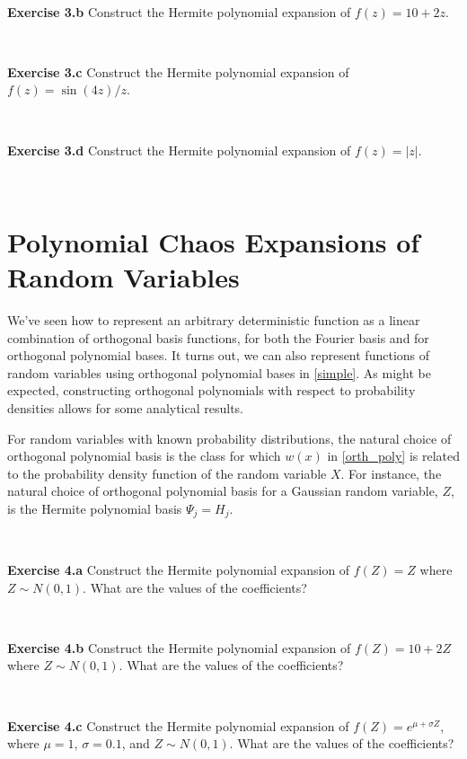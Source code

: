 \documentclass[11pt]{article}
\numberwithin{equation}{section}
\begin{document}
\

\textbf{Exercise 3.b} Construct the Hermite polynomial expansion of $f(z) = 10 + 2z$.

\

\textbf{Exercise 3.c} Construct the Hermite polynomial expansion of $f(z) = \sin(4z)/z$.

\

\textbf{Exercise 3.d} Construct the Hermite polynomial expansion of $f(z) = |z|$.

\






\section{Polynomial Chaos Expansions of Random Variables}

We've seen how to represent an arbitrary deterministic function as a linear combination of orthogonal basis functions, for both the Fourier basis and for orthogonal polynomial bases. It turns out, we can also represent functions of random variables using orthogonal polynomial bases in \eqref{simple}. As might be expected, constructing orthogonal polynomials with respect to probability densities allows for some analytical results.

\qquad For random variables with known probability distributions, the natural choice of orthogonal polynomial basis is the class for which $w(x)$ in \eqref{orth_poly} is related to the probability density function of the random variable $X$. For instance, the natural choice of orthogonal polynomial basis for a Gaussian random variable, $Z$,  is the Hermite polynomial basis $\Psi_j = H_j$. 

\

\textbf{Exercise 4.a} Construct the Hermite polynomial expansion of $f(Z) = Z$ where $Z \sim N(0,1)$. What are the values of the coefficients?

\

\textbf{Exercise 4.b} Construct the Hermite polynomial expansion of $f(Z) = 10 + 2Z$ where $Z \sim N(0,1)$. What are the values of the coefficients?

\

\textbf{Exercise 4.c} Construct the Hermite polynomial expansion of $f(Z) = e^{\mu + \sigma Z}$, where $\mu = 1$, $\sigma = 0.1$, and $Z \sim N(0,1)$. What are the values of the coefficients?

\
\end{document}
